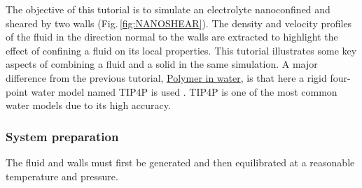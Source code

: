 \documentclass[9pt,tutorial]{livecoms}
\begin{document}
\noindent The objective of this tutorial is to simulate an electrolyte nanoconfined and sheared by two walls (Fig.\,\ref{fig:NANOSHEAR}). The density and velocity profiles of the fluid in the direction normal to the walls are extracted to highlight the effect of confining a fluid on its local properties. This tutorial illustrates some key aspects of combining a fluid and a solid in the same simulation. A major difference from the previous tutorial, \hyperref[all-atoms-label]{Polymer in water}, is that here a rigid four-point water model named TIP4P is used \cite{abascal2005general}. TIP4P is one of the most common water models due to its high accuracy.

\subsubsection{System preparation}
The fluid and walls must first be generated and then equilibrated at a reasonable temperature and pressure.
\end{document}

